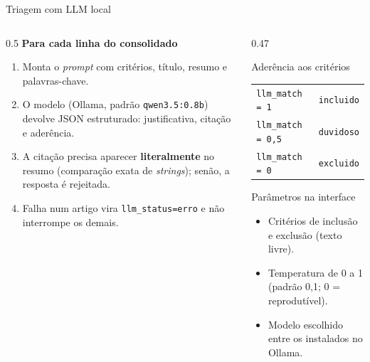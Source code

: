 \documentclass[aspectratio=169, 10pt]{beamer}
\newcommand{\cab}[1]{\textbf{\textcolor{radarcyan}{#1}}}
\begin{document}
\begin{frame}[t]{Triagem com LLM local}
  \small
  \begin{columns}[T,onlytextwidth]
    \begin{column}{0.5\textwidth}
      \cab{Para cada linha do consolidado}
      \begin{enumerate}\setlength{\itemsep}{2pt}\footnotesize
        \item Monta o \emph{prompt} com critérios, título, resumo e palavras-chave.
        \item O modelo (Ollama, padrão \texttt{qwen3.5:0.8b}) devolve JSON estruturado: justificativa, citação e aderência.
        \item A citação precisa aparecer \textbf{literalmente} no resumo (comparação exata de \emph{strings}); senão, a resposta é rejeitada.
        \item Falha num artigo vira \texttt{llm\_status=erro} e não interrompe os demais.
      \end{enumerate}
    \end{column}
    \begin{column}{0.47\textwidth}
      \begin{block}{Aderência aos critérios}
        \footnotesize
        \renewcommand{\arraystretch}{1.15}
        \begin{tabular}{@{}l l@{}}
          \texttt{llm\_match = 1}   & \texttt{incluido} \\
          \texttt{llm\_match = 0,5} & \texttt{duvidoso} \\
          \texttt{llm\_match = 0}   & \texttt{excluido} \\
        \end{tabular}
      \end{block}
      \vspace{2pt}
      \begin{exampleblock}{Parâmetros na interface}
        \footnotesize
        \begin{itemize}\setlength{\itemsep}{1pt}
          \item Critérios de inclusão e exclusão (texto livre).
          \item Temperatura de 0 a 1 (padrão 0,1; 0 = reprodutível).
          \item Modelo escolhido entre os instalados no Ollama.
        \end{itemize}
      \end{exampleblock}
    \end{column}
  \end{columns}
\end{frame}
\end{document}
